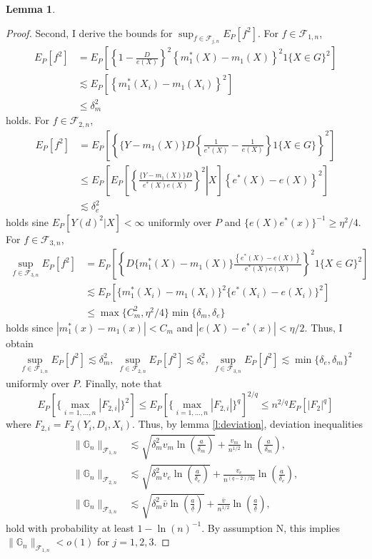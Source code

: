 \documentclass[12pt,oneside,reqno,english]{amsart}
\theoremstyle{definition}
\newtheorem{lemma}{Lemma}
\begin{document}
\begin{lemma}
\begin{proof}
Second, I derive the bounds for $\sup_{f\in \mathcal{F}_{j,n}}E_{P}[f^{2}]$. 
For $f\in \mathcal{F}_{1,n}$, 
\begin{align*}
E_{P}[f^{2}]&=E_{P}\left[\left\{1-\frac{D}{e(X)}\right\}^{2}\left\{m^{*}_{1}(X)-m_{1}(X)\right\}^{2}1\{X\in G\}^{2}\right]\\
&\lesssim E_{P}[\left\{m^{*}_{1}(X_{i})-m_{1}(X_{i})\right\}^{2}]\\
&\leq \delta_{m}^{2}
\end{align*}
holds. For $f\in \mathcal{F}_{2,n}$, 
\begin{align*}
E_{P}[f^{2}]&=E_{P}\left[\left\{\{Y-m_{1}(X)\}D\left\{\frac{1}{e^{*}(X)}-\frac{1}{e(X)}\right\}1\{X\in G\}\right\}^{2}\right]\\
&\leq E_{P}\left[\left. E_{P}\left[\left\{ \frac{\{Y-m_{1}(X)\}D}{e^{*}(X)e(X)}\right\}^{2}\right| X \right]\left\{e^{*}(X)-e(X)\right\}^{2}\right]\\
&\lesssim \delta_{e}^{2}
\end{align*}
holds sine $E_{P}[Y(d)^{2}|X]<\infty$ uniformly over $P$ and $\{e(X)e^{*}(x)\}^{-1}\geq \eta^{2}/4$.
For $f\in \mathcal{F}_{3,n}$,
\begin{align*}
\sup_{f\in \mathcal{F}_{3,n}}E_{P}[f^{2}] &=E_{P}\left[\left\{D\{m_{1}^{*}(X)-m_{1}(X)\}\frac{\left\{e^{*}(X)-e(X)\right\}}{e^{*}(X)e(X)}\right\}^{2}1\{X\in G\}^{2}\right]\\
&\lesssim E_{P}[\{m_{1}^{*}(X_{i})-m_{1}(X_{i})\}^{2}\{e^{*}(X_{i})-e(X_{i})\}^{2}]\\
&\leq \max\{C_{m}^{2},\eta^{2}/4\}\min\{\delta_{m},\delta_{e}\}
\end{align*}
holds since $|m_{1}^{*}(x)-m_{1}(x)|<C_{m}$ and $|e(X)-e^{*}(x)|< \eta/2$. 
Thus, I obtain 
\begin{align*}
\sup_{f\in \mathcal{F}_{1,n}}E_{P}[f^{2}]\lesssim \delta_{m}^{2},\ \sup_{f\in \mathcal{F}_{2,n}}E_{P}[f^{2}]\lesssim \delta_{e}^{2},\ \sup_{f\in \mathcal{F}_{3,n}}E_{P}[f^{2}]\lesssim \min\{\delta_{e},\delta_{m}\}^{2}
\end{align*}
uniformly over $P$. Finally, note that 
\[E_{P}[\{\max_{i=1,\ldots,n}|F_{2,i}|\}^{2}]\leq E_{P}[\{\max_{i=1,\ldots,n}|F_{2,i}|\}^{q}]^{2/q}\leq n^{2/q}E_{P}[|F_{2}|^{q}]\]
where $F_{2,i}=F_{2}(Y_{i},D_{i},X_{i})$.
Thus, by lemma \ref{l:deviation}, deviation inequalities 
\begin{align*}
\|\mathbb{G}_{n}\|_{\mathcal{F}_{1,n}}&\lesssim
 \sqrt{ \delta_{m}^{2} v_{m}\ln\left(\frac{a}{ \delta_{m}}\right)}+\frac{v_{m}}{n^{1/2}}\ln\left(\frac{a}{ \delta_{m}}\right), \\ 
\|\mathbb{G}_{n}\|_{\mathcal{F}_{2,n}}&\lesssim
 \sqrt{ \delta_{m}^{2} v_{e}\ln\left(\frac{a}{ \delta_{e}}\right)}+\frac{v_{e}}{n^{(q-2)/2q}}\ln\left(\frac{a}{ \delta_{e}}\right),\\
 \|\mathbb{G}_{n}\|_{\mathcal{F}_{3,n}}&\lesssim
 \sqrt{ \delta_{m}^{2} \bar{v}\ln\left(\frac{a}{\underline{\delta}}\right)}+\frac{\bar{v}}{n^{1/2}}\ln\left(\frac{a}{\underline{\delta}}\right), 
\end{align*}
hold with probability at least $1-\ln(n)^{-1}$. By assumption N, this implies $\|\mathbb{G}_{n}\|_{\mathcal{F}_{1,n}}< o(1)$ for $j= 1,2,3$.


\end{proof}
\end{lemma}
\end{document}
